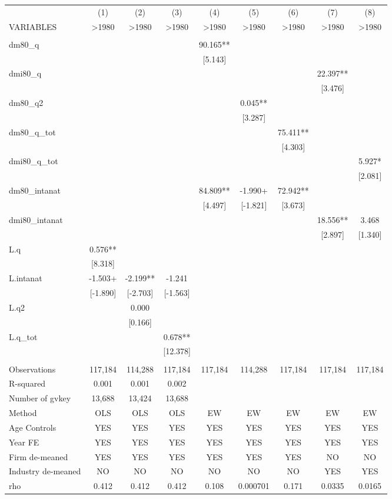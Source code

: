 \documentclass[]{article}
\begin{document}
\begin{tabular}{lcccccccc} \hline
 & (1) & (2) & (3) & (4) & (5) & (6) & (7) & (8) \\
VARIABLES & >1980 & >1980 & >1980 & >1980 & >1980 & >1980 & >1980 & >1980 \\ \hline
 &  &  &  &  &  &  &  &  \\
dm80\_q &  &  &  & 90.165** &  &  &  &  \\
 &  &  &  & [5.143] &  &  &  &  \\
dmi80\_q &  &  &  &  &  &  & 22.397** &  \\
 &  &  &  &  &  &  & [3.476] &  \\
dm80\_q2 &  &  &  &  & 0.045** &  &  &  \\
 &  &  &  &  & [3.287] &  &  &  \\
dm80\_q\_tot &  &  &  &  &  & 75.411** &  &  \\
 &  &  &  &  &  & [4.303] &  &  \\
dmi80\_q\_tot &  &  &  &  &  &  &  & 5.927* \\
 &  &  &  &  &  &  &  & [2.081] \\
dm80\_intanat &  &  &  & 84.809** & -1.990+ & 72.942** &  &  \\
 &  &  &  & [4.497] & [-1.821] & [3.673] &  &  \\
dmi80\_intanat &  &  &  &  &  &  & 18.556** & 3.468 \\
 &  &  &  &  &  &  & [2.897] & [1.340] \\
L.q & 0.576** &  &  &  &  &  &  &  \\
 & [8.318] &  &  &  &  &  &  &  \\
L.intanat & -1.503+ & -2.199** & -1.241 &  &  &  &  &  \\
 & [-1.890] & [-2.703] & [-1.563] &  &  &  &  &  \\
L.q2 &  & 0.000 &  &  &  &  &  &  \\
 &  & [0.166] &  &  &  &  &  &  \\
L.q\_tot &  &  & 0.678** &  &  &  &  &  \\
 &  &  & [12.378] &  &  &  &  &  \\
 &  &  &  &  &  &  &  &  \\
Observations & 117,184 & 114,288 & 117,184 & 117,184 & 114,288 & 117,184 & 117,184 & 117,184 \\
R-squared & 0.001 & 0.001 & 0.002 &  &  &  &  &  \\
Number of gvkey & 13,688 & 13,424 & 13,688 &  &  &  &  &  \\
Method & OLS & OLS & OLS & EW & EW & EW & EW & EW \\
Age Controls & YES & YES & YES & YES & YES & YES & YES & YES \\
Year FE & YES & YES & YES & YES & YES & YES & YES & YES \\
Firm de-meaned & YES & YES & YES & YES & YES & YES & NO & NO \\
Industry de-meaned & NO & NO & NO & NO & NO & NO & YES & YES \\
 rho & 0.412 & 0.412 & 0.412 & 0.108 & 0.000701 & 0.171 & 0.0335 & 0.0165 \\ \hline
\end{tabular}
\end{document}
